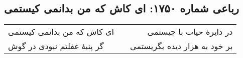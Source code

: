 \begin{center}
\section*{رباعی شماره ۱۷۵۰: ای کاش که من بدانمی کیستمی}
\label{sec:1750}
\begin{longtable}{l p{0.5cm} r}
ای کاش که من بدانمی کیستمی
&&
در دایرهٔ حیات با چیستمی
\\
گر پنبهٔ غفلتم نبودی در گوش
&&
بر خود به هزار دیده بگریستمی
\\
\end{longtable}
\end{center}

